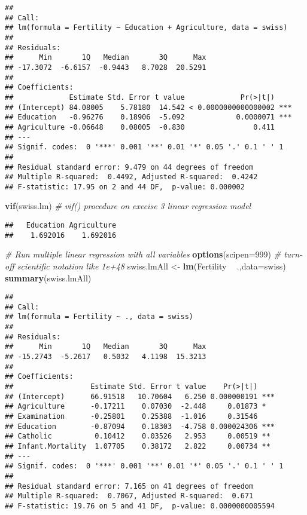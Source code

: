 \documentclass[]{article}
\newenvironment{Shaded}{\begin{snugshade}}{\end{snugshade}}
\newcommand{\CommentTok}[1]{\textcolor[rgb]{0.56,0.35,0.01}{\textit{#1}}}
\newcommand{\DataTypeTok}[1]{\textcolor[rgb]{0.13,0.29,0.53}{#1}}
\newcommand{\DecValTok}[1]{\textcolor[rgb]{0.00,0.00,0.81}{#1}}
\newcommand{\KeywordTok}[1]{\textcolor[rgb]{0.13,0.29,0.53}{\textbf{#1}}}
\newcommand{\NormalTok}[1]{#1}
\newcommand{\OperatorTok}[1]{\textcolor[rgb]{0.81,0.36,0.00}{\textbf{#1}}}
\newcommand{\StringTok}[1]{\textcolor[rgb]{0.31,0.60,0.02}{#1}}
\begin{document}
\begin{verbatim}
## 
## Call:
## lm(formula = Fertility ~ Education + Agriculture, data = swiss)
## 
## Residuals:
##      Min       1Q   Median       3Q      Max 
## -17.3072  -6.6157  -0.9443   8.7028  20.5291 
## 
## Coefficients:
##             Estimate Std. Error t value             Pr(>|t|)    
## (Intercept) 84.08005    5.78180  14.542 < 0.0000000000000002 ***
## Education   -0.96276    0.18906  -5.092            0.0000071 ***
## Agriculture -0.06648    0.08005  -0.830                0.411    
## ---
## Signif. codes:  0 '***' 0.001 '**' 0.01 '*' 0.05 '.' 0.1 ' ' 1
## 
## Residual standard error: 9.479 on 44 degrees of freedom
## Multiple R-squared:  0.4492, Adjusted R-squared:  0.4242 
## F-statistic: 17.95 on 2 and 44 DF,  p-value: 0.000002
\end{verbatim}

\begin{Shaded}
\begin{Highlighting}[]
\KeywordTok{vif}\NormalTok{(swiss.lm) }\CommentTok{# vif() procedure on execise 3 linear regression model}
\end{Highlighting}
\end{Shaded}

\begin{verbatim}
##   Education Agriculture 
##    1.692016    1.692016
\end{verbatim}

\begin{Shaded}
\begin{Highlighting}[]
\CommentTok{# Run multiple linear regression with all variables}
\KeywordTok{options}\NormalTok{(}\DataTypeTok{scipen=}\DecValTok{999}\NormalTok{)  }\CommentTok{# turn-off scientific notation like 1e+48}
\NormalTok{swiss.lmAll <-}\StringTok{ }\KeywordTok{lm}\NormalTok{(Fertility }\OperatorTok{~}\StringTok{ }\NormalTok{.,}\DataTypeTok{data=}\NormalTok{swiss) }
\KeywordTok{summary}\NormalTok{(swiss.lmAll)}
\end{Highlighting}
\end{Shaded}

\begin{verbatim}
## 
## Call:
## lm(formula = Fertility ~ ., data = swiss)
## 
## Residuals:
##      Min       1Q   Median       3Q      Max 
## -15.2743  -5.2617   0.5032   4.1198  15.3213 
## 
## Coefficients:
##                  Estimate Std. Error t value    Pr(>|t|)    
## (Intercept)      66.91518   10.70604   6.250 0.000000191 ***
## Agriculture      -0.17211    0.07030  -2.448     0.01873 *  
## Examination      -0.25801    0.25388  -1.016     0.31546    
## Education        -0.87094    0.18303  -4.758 0.000024306 ***
## Catholic          0.10412    0.03526   2.953     0.00519 ** 
## Infant.Mortality  1.07705    0.38172   2.822     0.00734 ** 
## ---
## Signif. codes:  0 '***' 0.001 '**' 0.01 '*' 0.05 '.' 0.1 ' ' 1
## 
## Residual standard error: 7.165 on 41 degrees of freedom
## Multiple R-squared:  0.7067, Adjusted R-squared:  0.671 
## F-statistic: 19.76 on 5 and 41 DF,  p-value: 0.0000000005594
\end{verbatim}
\end{document}

